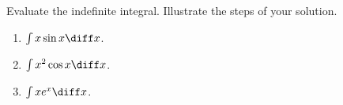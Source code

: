 Evaluate the indefinite integral. Illustrate the steps of your solution.
\begin{enumerate}
\item $ \int x\sin x\diff x$.
\item $ \int x^2\cos x\diff x$.
\item $ \int x e^x\diff x$.
\end{enumerate}
